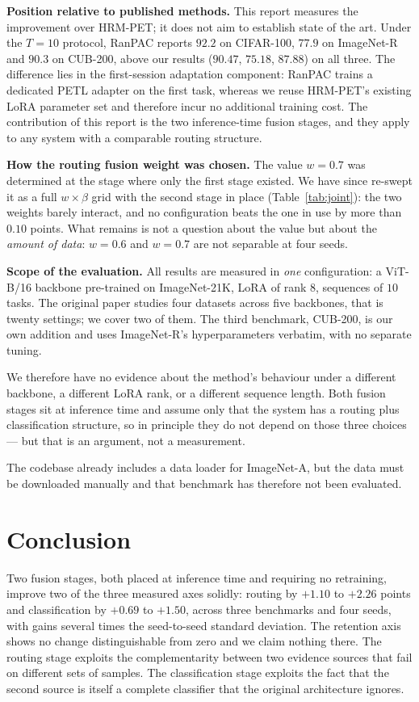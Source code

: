 \documentclass[11pt,a4paper]{article}
\begin{document}
\textbf{Position relative to published methods.} This report measures the
improvement over HRM-PET; it does not aim to establish state of the art. Under
the $T = 10$ protocol, RanPAC reports $92.2$ on CIFAR-100, $77.9$ on ImageNet-R
and $90.3$ on CUB-200, above our results ($90.47$, $75.18$, $87.88$) on all
three. The difference lies in the first-session adaptation component: RanPAC
trains a dedicated PETL adapter on the first task, whereas we reuse HRM-PET's
existing LoRA parameter set and therefore incur no additional training cost. The
contribution of this report is the two inference-time fusion stages, and they
apply to any system with a comparable routing structure.

\textbf{How the routing fusion weight was chosen.} The value $w = 0.7$ was
determined at the stage where only the first stage existed. We have since
re-swept it as a full $w \times \beta$ grid with the second stage in place
(Table~\ref{tab:joint}): the two weights barely interact, and no configuration
beats the one in use by more than $0.10$ points. What remains is not a question
about the value but about the \emph{amount of data}: $w = 0.6$ and $w = 0.7$ are
not separable at four seeds.

\textbf{Scope of the evaluation.} All results are measured in \emph{one}
configuration: a ViT-B/16 backbone pre-trained on ImageNet-21K, LoRA of rank
$8$, sequences of $10$ tasks. The original paper studies four datasets across
five backbones, that is twenty settings; we cover two of them. The third
benchmark, CUB-200, is our own addition and uses ImageNet-R's hyperparameters
verbatim, with no separate tuning.

We therefore have no evidence about the method's behaviour under a different
backbone, a different LoRA rank, or a different sequence length. Both fusion
stages sit at inference time and assume only that the system has a routing plus
classification structure, so in principle they do not depend on those three
choices --- but that is an argument, not a measurement.

The codebase already includes a data loader for ImageNet-A, but the data must be
downloaded manually and that benchmark has therefore not been evaluated.

\section{Conclusion}

Two fusion stages, both placed at inference time and requiring no retraining,
improve two of the three measured axes solidly: routing by $+1.10$ to $+2.26$
points and classification by $+0.69$ to $+1.50$, across three benchmarks and
four seeds, with gains several times the seed-to-seed standard deviation. The
retention axis shows no change distinguishable from zero and we claim nothing
there. The routing stage exploits the complementarity between two evidence
sources that fail on different sets of samples. The classification stage exploits the fact
that the second source is itself a complete classifier that the original
architecture ignores.
\end{document}
